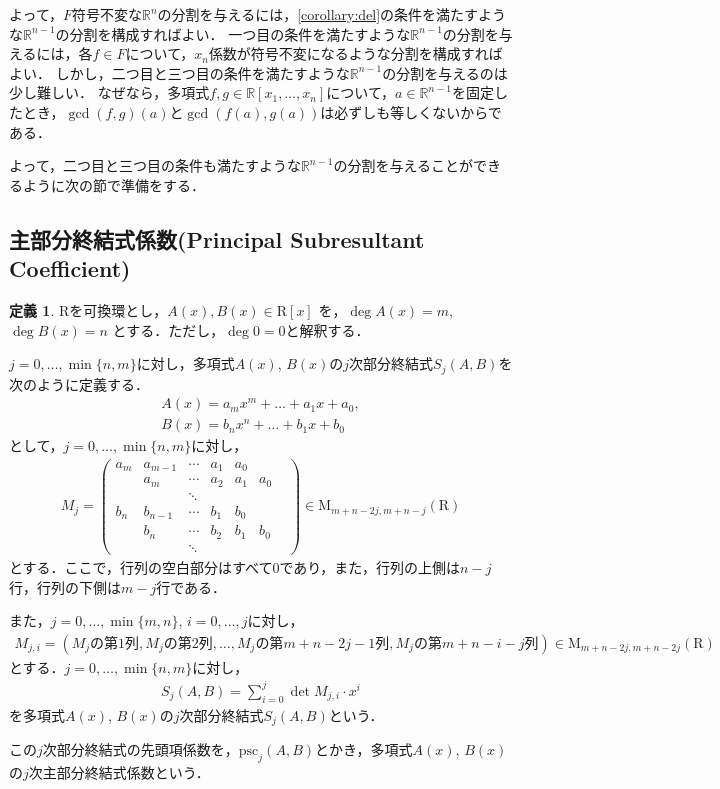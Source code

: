 \documentclass[uplatex, dvipdfmx]{jsarticle}
\newcommand{\R}{\mathbb{R}}
\newcommand{\psc}{\mathrm{psc}}
\theoremstyle{definition}
\newtheorem{definition}{定義}[section]
\begin{document}
よって，$F$符号不変な$\R^n$の分割を与えるには，\cref{corollary:del}の条件を満たすような$\R^{n-1}$の分割を構成すればよい．
一つ目の条件を満たすような$\R^{n-1}$の分割を与えるには，各$f \in F$について，$x_n$係数が符号不変になるような分割を構成すればよい．
しかし，二つ目と三つ目の条件を満たすような$\R^{n-1}$の分割を与えるのは少し難しい．
なぜなら，多項式$f, g \in \R[x_1, \dots, x_n]$について，$a \in \R^{n-1}$を固定したとき，$\gcd(f,g)(a)$と$\gcd(f(a),g(a))$は必ずしも等しくないからである．

よって，二つ目と三つ目の条件も満たすような$\R^{n-1}$の分割を与えることができるように次の節で準備をする．

\subsection{主部分終結式係数(Principal Subresultant Coefficient)}

\begin{definition}
$\mathrm{R}$を可換環とし，$A(x), B(x) \in \mathrm{R}[x]$ を，$\deg A(x) = m$, $\deg B(x) = n$ とする．ただし，$\deg 0 = 0$と解釈する．

$j = 0, \dots, \min\{n, m\}$に対し，多項式$A(x)$, $B(x)$の$j$次部分終結式$S_j(A, B)$を次のように定義する．
\begin{align*}
A(x) = a_m x^m + \dots + a_1 x + a_0, \\
B(x) = b_n x^n + \dots + b_1 x + b_0 
\end{align*}
として，$j = 0, \dots, \min\{n,m\}$に対し，
\begin{align*}
M_j = 
\begin{pmatrix}
a_m & a_{m-1} & \cdots & a_1 & a_0 &    &  \\
     &  a_m     & \cdots & a_2 & a_1& a_0 &  \\
     &   & \ddots &  & & \\
b_n & b_{n-1} & \cdots & b_1 & b_0 &    & \\
     &  b_n     & \cdots & b_2 & b_1& b_0 & \\
     &   & \ddots &  & & 
\end{pmatrix}
\in \mathrm{M}_{m+n-2j, m+n-j}(\mathrm{R})
\end{align*}
とする．ここで，行列の空白部分はすべて$0$であり，また，行列の上側は$n-j$行，行列の下側は$m-j$行である．

また，$j = 0, \dots, \min\{m,n\}$, $i = 0, \dots, j$に対し，
\begin{align*}
M_{j,i} = (\text{$M_j$の第$1$列}, \text{$M_j$の第$2$列}, \dots ,\text{$M_j$の第$m+n-2j-1$列}, \text{$M_j$の第$m+n-i-j$列})
\in \mathrm{M}_{m+n-2j, m+n-2j}(\mathrm{R})
\end{align*}
とする．$j = 0, \dots, \min\{n, m\}$に対し，
\begin{align*}
S_j(A, B) = \sum_{i=0}^j \det M_{j, i} \cdot x^i 
\end{align*}
を多項式$A(x)$, $B(x)$の$j$次部分終結式$S_j(A, B)$という．

この$j$次部分終結式の先頭項係数を，$\psc_j(A,B)$とかき，多項式$A(x)$, $B(x)$の$j$次主部分終結式係数という．
\end{definition}
\end{document}
